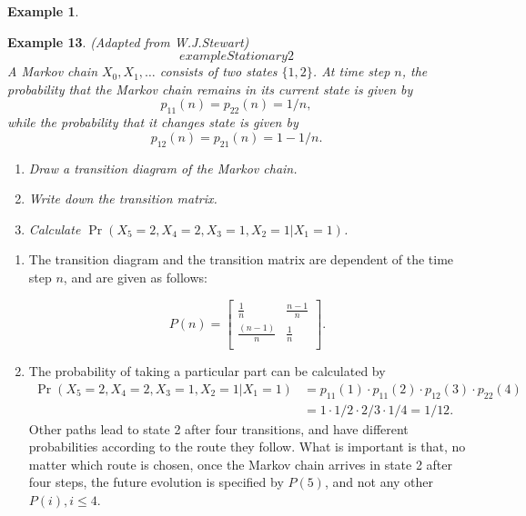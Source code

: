 \documentclass[
]{book}
\theoremstyle{definition}
\theoremstyle{definition}
\newtheorem{example}{Example}[chapter]
\theoremstyle{definition}
\theoremstyle{definition}
\theoremstyle{remark}
\begin{document}
\begin{example}
\protect\hypertarget{exm:unlabeled-div-21}{}\label{exm:unlabeled-div-21}

\textbf{Example 13}. \emph{(Adapted from W.J.Stewart)
\protect\hypertarget{exampleStationary2}{}{\[exampleStationary2\]}
A Markov chain \(X_0, X_1, \ldots\) consists of two states \(\{1,2\}\). At
time step \(n\), the probability that the Markov chain remains in its
current state is given by \[p_{11}(n) = p_{22}(n) = 1/n,\] while the
probability that it changes state is given by
\[p_{12}(n) = p_{21}(n) = 1 - 1/n.\]}

\begin{enumerate}
\def\labelenumi{\arabic{enumi}.}
\item
  \emph{Draw a transition diagram of the Markov chain.}
\item
  \emph{Write down the transition matrix.}
\item
  \emph{Calculate \(\Pr(X_5 = 2, X_4 = 2, X_3 = 1, X_2 =1 | X_1 = 1)\).}
\end{enumerate}

\end{example}

\begin{enumerate}
\def\labelenumi{\arabic{enumi}.}
\item
  The transition diagram and the transition matrix are dependent of
  the time step \(n\), and are given as follows:

  \[P(n) = \begin{bmatrix}
      \frac{1}{n} & \frac{n-1}{n}   \\
      \frac{(n-1)}{n} & \frac{1}{n}   \\
  \end{bmatrix}.\]
\item
  The probability of taking a particular part can be calculated by
  \[\begin{aligned}
      \Pr(X_5 = 2, X_4 = 2, X_3 = 1, X_2 =1 | X_1 = 1)  &= p_{11}(1) \cdot p_{11}(2) \cdot p_{12}(3) \cdot p_{22}(4) \\
          &= 1 \cdot 1/2 \cdot 2/3 \cdot 1/4 = 1/12.\end{aligned}\]
  Other paths lead to state 2 after four transitions, and have
  different probabilities according to the route they follow. What is
  important is that, no matter which route is chosen, once the Markov
  chain arrives in state 2 after four steps, the future evolution is
  specified by \(P(5)\), and not any other \(P(i), i \le 4\).
\end{enumerate}
\end{document}
